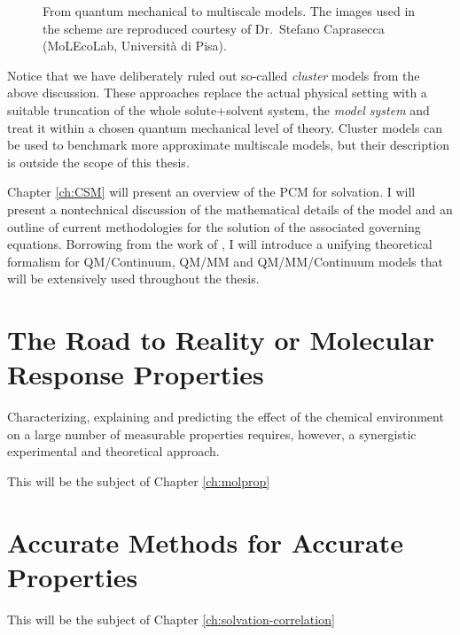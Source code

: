 \begin{figure}[tb]
\caption[From quantum mechanical to multiscale models]{
From quantum mechanical to multiscale models.
The images used in the scheme are reproduced courtesy of Dr.~Stefano
Caprasecca (MoLEcoLab, Università di Pisa).}
\label{fig:qm-to-multiscale}
\end{figure}

Notice that we have deliberately ruled out so-called \emph{cluster}
models from the above discussion.
These approaches replace the actual physical setting with a suitable
truncation of the whole solute+solvent system, the \emph{model system}
and treat it within a chosen quantum mechanical level of theory.
Cluster models can be used to benchmark more approximate multiscale
models, but their description is outside the scope of this thesis.

Chapter \ref{ch:CSM} will present an overview of the \gls{PCM} for
solvation.
I will present a nontechnical discussion of the mathematical details of
the model and an outline of current methodologies for the solution of
the associated governing equations.
Borrowing from the work of \citeauthor{Lipparini2010-be},\autocite{Lipparini2010-be,
Lipparini2015-lq} I will introduce a unifying theoretical formalism for
\acrshort{QM}/Continuum, \acrshort{QM}/\acrshort{MM} and \acrshort{QM}/\acrshort{MM}/Continuum models that will
be extensively used throughout the thesis.

\section*{The Road to Reality or Molecular Response Properties}

Characterizing, explaining and predicting the effect of the chemical
environment on a large number of measurable properties requires,
however, a synergistic experimental and theoretical approach.

This will be the subject of Chapter \ref{ch:molprop}

\section*{Accurate Methods for Accurate Properties}

This will be the subject of Chapter \ref{ch:solvation-correlation}
